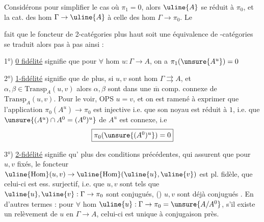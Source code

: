 Considérons pour simplifier le cas où \(\pi_1=0\), alors \(\uline{A}\) se réduit à \(\pi_0\), et la cat. des hom \(\Gamma\to\uline{A}\) à celle des hom \(\Gamma\to\pi_0\). Le



fait que le foncteur de 2-catégories plus haut  soit une équivalence de -catégories se traduit alors pas à pas ainsi :

1°) \uline{0 fidélité} signifie que pour \(\forall\) hom \(u:\Gamma\to A\), on a \(\pi_1(\unsure{A^u})=0\)


2°) \uline{1-fidélité} signifie que de plus, si \(u,v\) sont  hom \(\Gamma\rightrightarrows A\), et  \(\alpha,\beta\in\mathrm{Transp}_A(u,v)\)     alors \(\alpha,\beta\) sont dans une \(\overline{\mathrm m}\)  comp. connexe de \(\mathrm{Transp}_A(u,v)\).    Pour le voir, OPS \(u=v\), et  on est ramené à exprimer que l'application \(\pi_0(A^u)\to\pi_0\) est injective i.e. que  son noyau est réduit à \(1\), i.e. que  \(\unsure{(A^u)\cap A^0=(A^0)^u}\) de \(A^u\) est connexe, i.e
\[
\fbox{\(\pi_0(\unsure{(A^0)^u})=0\)}
\]



3°) \uline{2-fidélité} signifie qu' plus des conditions précédentes, qui assurent que pour \(u,v\) fixés, le foncteur \(\uline{\mathrm{Hom}}(u,v)\to\uline{\mathrm{Hom}}(\uline{u},\uline{v})\) est pl. fidèle, que celui-ci est ess. surjectif, i.e. que  \(u,v\) sont tels que \(\uline{u},\uline{v}:\Gamma\to\pi_0\) sont conjugués,  () \(u,v\) sont déjà conjugués . En d'autres termes : pour \(\forall\) hom \(\uline{u}:\Gamma\to\pi_0=\unsure{A/A^0}\), s'il existe un relèvement de \(u\) en \(\Gamma\to A\), celui-ci est unique à conjugaison près.

